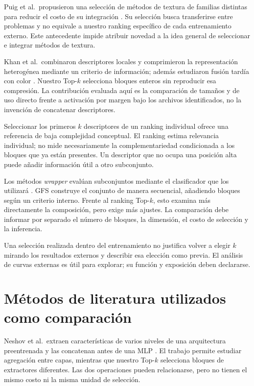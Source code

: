Puig et al.\ propusieron una selección de métodos de textura de familias distintas para reducir el costo de su integración \citep{puig2010selection}. Su selección busca transferirse entre problemas y no equivale a nuestro ranking específico de cada entrenamiento externo. Este antecedente impide atribuir novedad a la idea general de seleccionar e integrar métodos de textura.

Khan et al.\ combinaron descriptores locales y comprimieron la representación heterogénea mediante un criterio de información; además estudiaron fusión tardía con color \citep{khan2015compact}. Nuestro Top-\(k\) selecciona bloques enteros sin reproducir esa compresión. La contribución evaluada aquí es la comparación de tamaños y de uso directo frente a activación por margen bajo los archivos identificados, no la invención de concatenar descriptores.

Seleccionar los primeros \(k\) descriptores de un ranking individual ofrece una referencia de baja complejidad conceptual. El ranking estima relevancia individual; no mide necesariamente la complementariedad condicionada a los bloques que ya están presentes. Un descriptor que no ocupa una posición alta puede añadir información útil a otro subconjunto.

Los métodos \emph{wrapper} evalúan subconjuntos mediante el clasificador que los utilizará \citep{kohavi1997wrappers,guyon2003feature}. GFS construye el conjunto de manera secuencial, añadiendo bloques según un criterio interno. Frente al ranking Top-\(k\), esto examina más directamente la composición, pero exige más ajustes. La comparación debe informar por separado el número de bloques, la dimensión, el costo de selección y la inferencia.

Una selección realizada dentro del entrenamiento no justifica volver a elegir \(k\) mirando los resultados externos y describir esa elección como previa. El análisis de curvas externas es útil para explorar; su función y exposición deben declararse.

\section{Métodos de literatura utilizados como comparación}
Neshov et al.\ extraen características de varios niveles de una arquitectura preentrenada y las concatenan antes de una MLP \citep{neshov2025aggregation}. El trabajo permite estudiar agregación entre capas, mientras que nuestro Top-\(k\) selecciona bloques de extractores diferentes. Las dos operaciones pueden relacionarse, pero no tienen el mismo costo ni la misma unidad de selección.


